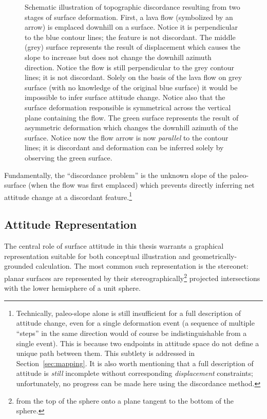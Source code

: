 \begin{figure}
    \caption[Discordance \& attitude change]{Schematic illustration of topographic discordance resulting from two stages of surface deformation. First, a lava flow (symbolized by an arrow) is emplaced downhill on a surface. Notice it is perpendicular to the blue contour lines; the feature is not discordant. The middle (grey) surface represents the result of displacement which causes the slope to increase but does not change the downhill azimuth direction. Notice the flow is still perpendicular to the grey contour lines; it is not discordant. Solely on the basis of the lava flow on grey surface (with no knowledge of the original blue surface) it would be impossible to infer surface attitude change. Notice also that the surface deformation responsible is symmetrical across the vertical plane containing the flow. The green surface represents the result of asymmetric deformation which changes the downhill azimuth of the surface. Notice now the flow arrow is now \emph{parallel} to the contour lines; it is discordant and deformation can be inferred solely by observing the green surface.}%
    \label{fig:discordance-concept}
\end{figure}

Fundamentally, the ``discordance problem'' is the unknown slope of the paleo-surface (when the flow was first emplaced) which prevents directly inferring net attitude change at a discordant feature.\footnote{Technically, paleo-slope alone is still insufficient for a full description of attitude change, even for a single deformation event (a sequence of multiple ``steps'' in the same direction would of course be indistinguishable from a single event). This is because two endpoints in attitude space do not define a unique path between them. This subtlety is addressed in Section~\ref{sec:mapping}. It is also worth mentioning that a full description of attitude is \emph{still} incomplete without corresponding \emph{displacement} constraints; unfortunately, no progress can be made here using the discordance method.}

\subsection{Attitude Representation}\label{sec:attitude-representation}

The central role of surface attitude in this thesis warrants a graphical representation suitable for both conceptual illustration and geometrically-grounded calculation. The most common such representation is the stereonet: planar surfaces are represented by their stereographically\footnote{from the top of the sphere onto a plane tangent to the bottom of the sphere.} projected intersections with the lower hemisphere of a unit sphere.

